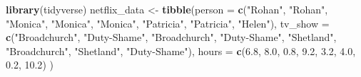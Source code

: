 \documentclass[
]{book}
\newenvironment{Shaded}{\begin{snugshade}}{\end{snugshade}}
\newcommand{\DataTypeTok}[1]{\textcolor[rgb]{0.13,0.29,0.53}{#1}}
\newcommand{\FloatTok}[1]{\textcolor[rgb]{0.00,0.00,0.81}{#1}}
\newcommand{\KeywordTok}[1]{\textcolor[rgb]{0.13,0.29,0.53}{\textbf{#1}}}
\newcommand{\NormalTok}[1]{#1}
\newcommand{\StringTok}[1]{\textcolor[rgb]{0.31,0.60,0.02}{#1}}
\begin{document}
\begin{Shaded}
\begin{Highlighting}[]
\KeywordTok{library}\NormalTok{(tidyverse)}
\NormalTok{netflix_data <-}\StringTok{ }
\StringTok{  }\KeywordTok{tibble}\NormalTok{(}\DataTypeTok{person =} \KeywordTok{c}\NormalTok{(}\StringTok{"Rohan"}\NormalTok{, }\StringTok{"Rohan"}\NormalTok{, }\StringTok{"Monica"}\NormalTok{, }\StringTok{"Monica"}\NormalTok{, }\StringTok{"Monica"}\NormalTok{, }
                    \StringTok{"Patricia"}\NormalTok{, }\StringTok{"Patricia"}\NormalTok{, }\StringTok{"Helen"}\NormalTok{),}
         \DataTypeTok{tv_show =} \KeywordTok{c}\NormalTok{(}\StringTok{"Broadchurch"}\NormalTok{, }\StringTok{"Duty-Shame"}\NormalTok{, }\StringTok{"Broadchurch"}\NormalTok{, }\StringTok{"Duty-Shame"}\NormalTok{, }
                     \StringTok{"Shetland"}\NormalTok{, }\StringTok{"Broadchurch"}\NormalTok{, }\StringTok{"Shetland"}\NormalTok{, }\StringTok{"Duty-Shame"}\NormalTok{),}
         \DataTypeTok{hours =} \KeywordTok{c}\NormalTok{(}\FloatTok{6.8}\NormalTok{, }\FloatTok{8.0}\NormalTok{, }\FloatTok{0.8}\NormalTok{, }\FloatTok{9.2}\NormalTok{, }\FloatTok{3.2}\NormalTok{, }\FloatTok{4.0}\NormalTok{, }\FloatTok{0.2}\NormalTok{, }\FloatTok{10.2}\NormalTok{)}
\NormalTok{         )}
\end{Highlighting}
\end{Shaded}
\end{document}
